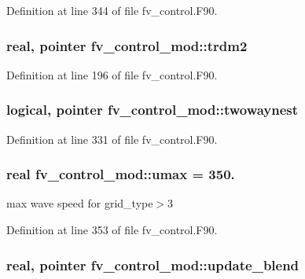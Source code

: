 Definition at line 344 of file fv\-\_\-control.\-F90.

\subsubsection[{trdm2}]{\setlength{\rightskip}{0pt plus 5cm}real, pointer fv\-\_\-control\-\_\-mod\-::trdm2\hspace{0.3cm}{\ttfamily [private]}}\label{classfv__control__mod_a1c559ada35adc60b532cc77e0a7963ec}


Definition at line 196 of file fv\-\_\-control.\-F90.

\subsubsection[{twowaynest}]{\setlength{\rightskip}{0pt plus 5cm}logical, pointer fv\-\_\-control\-\_\-mod\-::twowaynest\hspace{0.3cm}{\ttfamily [private]}}\label{classfv__control__mod_ac3aa92c051cecb429cfe4459f0bc20ec}


Definition at line 331 of file fv\-\_\-control.\-F90.

\subsubsection[{umax}]{\setlength{\rightskip}{0pt plus 5cm}real fv\-\_\-control\-\_\-mod\-::umax = 350.\hspace{0.3cm}{\ttfamily [private]}}\label{classfv__control__mod_a6da7ed00f053d3675e9de3748bf8931e}


max wave speed for grid\-\_\-type$>$3 



Definition at line 353 of file fv\-\_\-control.\-F90.

\subsubsection[{update\-\_\-blend}]{\setlength{\rightskip}{0pt plus 5cm}real, pointer fv\-\_\-control\-\_\-mod\-::update\-\_\-blend\hspace{0.3cm}{\ttfamily [private]}}\label{classfv__control__mod_adc0d08b31c495fc6b3e272b90b654a98}


